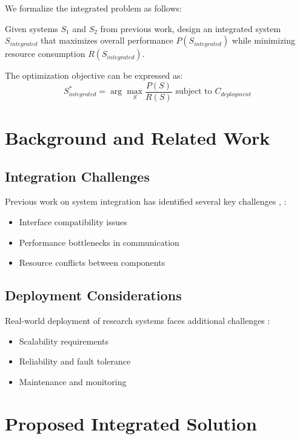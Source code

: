 We formalize the integrated problem as follows:
\begin{definition}
Given systems $S_1$ and $S_2$ from previous work, design an integrated system $S_{integrated}$ that maximizes overall performance $P(S_{integrated})$ while minimizing resource consumption $R(S_{integrated})$.
\end{definition}

The optimization objective can be expressed as:
\begin{equation}
S_{integrated}^* = \arg\max_{S} \frac{P(S)}{R(S)} \text{ subject to } C_{deployment}
\label{eq:integrated-objective}
\end{equation}

\section{Background and Related Work}

\subsection{Integration Challenges}
Previous work on system integration has identified several key challenges \cite{example-reference-12}, \cite{example-reference-13}:
\begin{itemize}
    \item Interface compatibility issues
    \item Performance bottlenecks in communication
    \item Resource conflicts between components
\end{itemize}

\subsection{Deployment Considerations}
Real-world deployment of research systems faces additional challenges \cite{example-reference-14}:
\begin{itemize}
    \item Scalability requirements
    \item Reliability and fault tolerance
    \item Maintenance and monitoring
\end{itemize}

\section{Proposed Integrated Solution}

